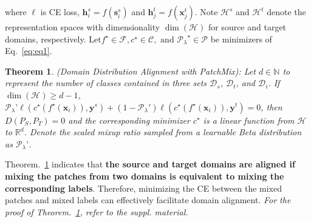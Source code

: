 \documentclass[10pt,twocolumn,letterpaper, ]{article}
\newtheorem{theorem}{Theorem}
\begin{document}
where $\ell$ is CE loss, $\boldsymbol{h}_{i}^{s} = f(\boldsymbol{s}^{s}_{i})$ and $\boldsymbol{h}_{j}^{t} = f(\boldsymbol{x}^{t}_{j})$. Note $\mathcal{H}^{s}$ and $\mathcal{H}^{t}$ denote the representation spaces with dimensionality $\operatorname{dim}(\mathcal{H})$ for source and target domains, respectively. $\text {Let} f^{\star} \in \mathcal{F}, c^{\star} \in \mathcal{C}, \text{ and } {\mathcal{P}_{\lambda}}^{\star} \in \mathcal{P}$ be minimizers of Eq.~\ref{eq:eq1}.
\begin{theorem}
\label{theorem:Distribution estimation1}
(Domain Distribution Alignment with PatchMix): 
Let $d \in \mathbb{N}$ to represent the number of classes contained in three sets $\mathcal D_{s}$, $\mathcal D_{t}$, and $\mathcal D_{i}$. If $\operatorname{dim}(\mathcal{H}) \geq d-1$, ${\mathcal{P}_{\lambda}}’ \ell(c^{\star}(f^{\star}(\boldsymbol{x}_{i})),\boldsymbol{y}^{s})+ (1-{\mathcal{P}_{\lambda}}')\ell(c^{\star}(f^{\star}(\boldsymbol{x}_{i})),\boldsymbol{y}^{t})=0$, then $D\left(P_{S},P_{T}\right)=0$ and the corresponding minimizer $c^{\star}$ is a linear function from $\mathcal{H}$ to $\mathbb{R}^{d}$. Denote the scaled mixup ratio sampled from a learnable Beta distribution as $\mathcal{P}_{\lambda}’$.
\end{theorem}
Theorem.~\ref{theorem:Distribution estimation1} indicates that \textbf{the source and target domains are aligned if mixing the patches from two domains is equivalent to mixing the corresponding labels}. Therefore, minimizing the CE between the mixed patches and mixed labels can effectively facilitate domain alignment. \textit{For the proof of Theorem.~\ref{theorem:Distribution estimation1}, refer to the suppl. material.}


\vspace{-10pt}
\end{document}
